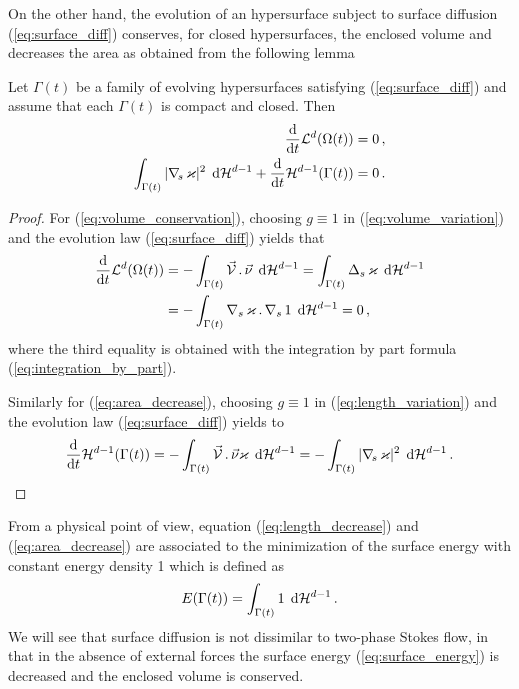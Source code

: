 On the other hand, the evolution of an hypersurface subject to surface
diffusion (\ref{eq:surface_diff}) conserves, for closed hypersurfaces, the
enclosed volume and decreases the area as obtained from the following
lemma

\begin{lemma}
Let $\Gamma(t)$ be a family of evolving hypersurfaces satisfying
(\ref{eq:surface_diff}) and assume that each $\Gamma(t)$ is
compact and closed. Then
\begin{align}
\frac{\rm d}{{\rm d}t} \mathcal{L}^d(\Omega(t)) & = 0 \,, \label{eq:volume_conservation} \\
\int_{\Gamma(t)} |\nabla_{\!s} \, \varkappa|^2 \, \;{\rm d}{\cal H}^{d-1} + \frac{\rm d}{{\rm d}t} \mathcal{H}^{d-1} (\Gamma(t))
& = 0 \,.\label{eq:area_decrease}
\end{align}
\end{lemma}

\begin{proof}
For (\ref{eq:volume_conservation}), choosing $g \equiv 1$ in
(\ref{eq:volume_variation}) and the evolution law (\ref{eq:surface_diff}) yields
that
\begin{align*}
\frac{\rm d}{{\rm d}t} \mathcal{L}^d(\Omega(t)) & = - \int_{\Gamma(t)} \vec{\mathcal{V}}\,.\,\vec\nu \,
\;{\rm d}{\cal H}^{d-1} = \int_{\Gamma(t)} \Delta_s \, \varkappa \, \;{\rm d}{\cal H}^{d-1} \nonumber \\
& = -\int_{\Gamma(t)} \nabla_s \, \varkappa \,.\, \nabla_s \, 1 \, \;{\rm d}{\cal H}^{d-1}=0\,,
\end{align*}
where the third equality is obtained with the integration by part formula
(\ref{eq:integration_by_part}).

Similarly for (\ref{eq:area_decrease}), choosing $g \equiv 1$ in
(\ref{eq:length_variation}) and the evolution law (\ref{eq:surface_diff}) yields
to
\begin{equation*}
\frac{\rm d}{{\rm d}t} \mathcal{H}^{d-1}(\Gamma(t)) = - \int_{\Gamma(t)} \vec{\mathcal{V}}\,.\,\vec\nu
\varkappa \, \;{\rm d}{\cal H}^{d-1} = - \int_{\Gamma(t)} |\nabla_{\!s} \, \varkappa|^2 \, \;{\rm d}{\cal H}^{d-1}\,.
\end{equation*}
\end{proof}

From a physical point of view, equation (\ref{eq:length_decrease}) and
(\ref{eq:area_decrease}) are associated to the minimization of the surface
energy with constant energy density 1 which is defined as
\begin{equation}\label{eq:surface_energy}
E(\Gamma(t)) = \int_{\Gamma(t)} 1 \, \;{\rm d}{\cal H}^{d-1} \, .
\end{equation}
We will see that surface diffusion is not dissimilar to two-phase Stokes flow,
in that in the absence of external forces the surface energy
(\ref{eq:surface_energy}) is decreased and the enclosed volume is conserved.

